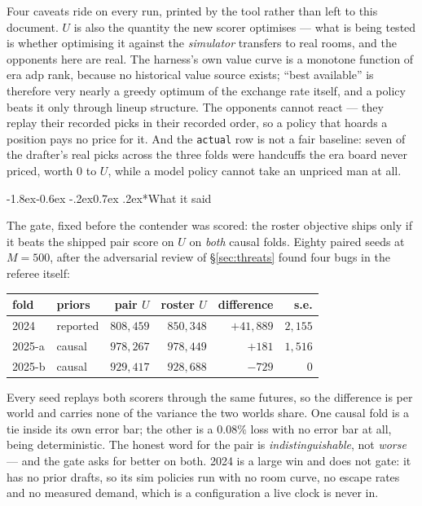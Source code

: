 \documentclass[10pt,a4paper]{article}
\makeatletter
\theoremstyle{plain}
\theoremstyle{definition}
\theoremstyle{remark}
\newcommand{\code}[1]{\texttt{\small #1}}
\renewcommand\subsubsection{\@startsection{subsubsection}{3}{\z@}%
  {-1.8ex\@plus -0.6ex \@minus -.2ex}{0.7ex \@plus .2ex}{\normalfont\normalsize\bfseries}}
\makeatother
\begin{document}
Four caveats ride on every run, printed by the tool rather than left to this document. $U$
is also the quantity the new scorer optimises --- what is being tested is whether optimising
it against the \emph{simulator} transfers to real rooms, and the opponents here are real.
The harness's own value curve is a monotone function of era adp rank, because no historical
value source exists; ``best available'' is therefore very nearly a greedy optimum of the
exchange rate itself, and a policy beats it only through lineup structure. The opponents
cannot react --- they replay their recorded picks in their recorded order, so a policy that
hoards a position pays no price for it. And the \code{actual} row is not a fair baseline:
seven of the drafter's real picks across the three folds were handcuffs the era board never
priced, worth $0$ to $U$, while a model policy cannot take an unpriced man at all.

\subsubsection*{What it said}

The gate, fixed before the contender was scored: the roster objective ships only if it
beats the shipped pair score on $U$ on \emph{both} causal folds. Eighty paired seeds at
$M = 500$, after the adversarial review of \S\ref{sec:threats} found four bugs in the
referee itself:

\begin{center}
\begin{tabular}{@{}llrrrr@{}}
\toprule
fold & priors & pair $U$ & roster $U$ & difference & s.e. \\
\midrule
2024   & reported & $808{,}459$ & $850{,}348$ & $+41{,}889$ & $2{,}155$ \\
2025-a & causal   & $978{,}267$ & $978{,}449$ & $+181$      & $1{,}516$ \\
2025-b & causal   & $929{,}417$ & $928{,}688$ & $-729$      & $0$ \\
\bottomrule
\end{tabular}
\end{center}

Every seed replays both scorers through the same futures, so the difference is per world
and carries none of the variance the two worlds share. One causal fold is a tie inside its
own error bar; the other is a $0.08\%$ loss with no error bar at all, being deterministic.
The honest word for the pair is \emph{indistinguishable}, not \emph{worse} --- and the gate
asks for better on both. 2024 is a large win and does not gate: it has no prior drafts, so
its sim policies run with no room curve, no escape rates and no measured demand, which is a
configuration a live clock is never in.
\end{document}
